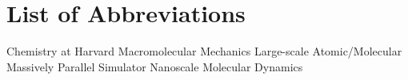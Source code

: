 \chapter*{List of Abbreviations}
\begin{acronym}[CHARMM] %
  {Chemistry at Harvard Macromolecular Mechanics}
  {Large-scale Atomic/Molecular Massively Parallel Simulator}
    {Nanoscale Molecular Dynamics}
\end{acronym} 
